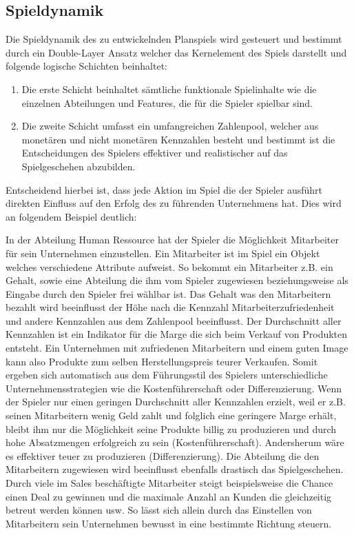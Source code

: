 \subsection{Spieldynamik}
Die Spieldynamik des zu entwickelnden Planspiels wird gesteuert und bestimmt durch ein Double-Layer Ansatz welcher das Kernelement des Spiels darstellt und folgende logische Schichten beinhaltet:
\begin{enumerate}
\item Die erste Schicht beinhaltet sämtliche funktionale Spielinhalte wie die einzelnen Abteilungen und Features, die für die Spieler spielbar sind.
\item Die zweite Schicht umfasst ein umfangreichen Zahlenpool, welcher aus monetären und nicht monetären Kennzahlen besteht und bestimmt ist die Entscheidungen des Spielers effektiver und realistischer auf das Spielgeschehen abzubilden.
\end{enumerate}
Entscheidend hierbei ist, dass jede Aktion im Spiel die der Spieler ausführt direkten Einfluss auf den Erfolg des zu führenden Unternehmens hat. Dies wird an folgendem Beispiel deutlich:
\par In der Abteilung Human Ressource hat der Spieler die Möglichkeit Mitarbeiter für sein Unternehmen einzustellen. Ein Mitarbeiter ist im Spiel ein Objekt welches verschiedene Attribute aufweist. So bekommt ein Mitarbeiter z.B. ein Gehalt, sowie eine Abteilung die ihm vom Spieler zugewiesen beziehungsweise als Eingabe durch den Spieler frei wählbar ist. Das Gehalt was den Mitarbeitern bezahlt wird beeinflusst der Höhe nach die Kennzahl Mitarbeiterzufriedenheit und andere Kennzahlen aus dem Zahlenpool beeinflusst. Der Durchschnitt aller Kennzahlen ist ein Indikator für die Marge die sich beim Verkauf von Produkten entsteht. Ein Unternehmen mit zufriedenen Mitarbeitern und einem guten Image kann also Produkte zum selben Herstellungspreis teurer Verkaufen. Somit ergeben sich automatisch aus dem Führungsstil des Spielers unterschiedliche Unternehmensstrategien wie die Kostenführerschaft oder Differenzierung. Wenn der Spieler nur einen geringen Durchschnitt aller Kennzahlen erzielt, weil er z.B. seinen Mitarbeitern wenig Geld zahlt und folglich eine geringere Marge erhält, bleibt ihm nur die Möglichkeit seine Produkte billig zu produzieren und durch hohe Absatzmengen erfolgreich zu sein (Kostenführerschaft). Andersherum wäre es effektiver teuer zu produzieren (Differenzierung). Die Abteilung die den Mitarbeitern zugewiesen wird beeinflusst ebenfalls drastisch das Spielgeschehen. Durch viele im Sales beschäftigte Mitarbeiter steigt beispielsweise die Chance einen Deal zu gewinnen und die maximale Anzahl an Kunden die gleichzeitig betreut werden können usw. So lässt sich allein durch das Einstellen von Mitarbeitern sein Unternehmen bewusst in eine bestimmte Richtung steuern.
